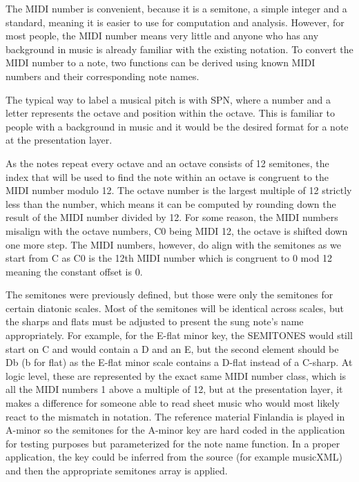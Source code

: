 The MIDI number is convenient, because it is a semitone, a simple integer and a standard, meaning it is easier to use for computation and analysis. However, for most people, the MIDI number means very little and anyone who has any background in music is already familiar with the existing notation. To convert the MIDI number to a note, two functions can be derived using known MIDI numbers and their corresponding note names. 

The typical way to label a musical pitch is with SPN, where a number and a letter represents the octave and position within the octave. This is familiar to people with a background in music and it would be the desired format for a note at the presentation layer.

As the notes repeat every octave and an octave consists of 12 semitones, the index that will be used to find the note within an octave is congruent to the MIDI number modulo 12. The octave number is the largest multiple of 12 strictly less than the number, which means it can be computed by rounding down the result of the MIDI number divided by 12. For some reason, the MIDI numbers misalign with the octave numbers, C0 being MIDI 12, the octave is shifted down one more step. The MIDI numbers, however, do align with the semitones as we start from C as C0 is the 12th MIDI number which is congruent to 0 mod 12 meaning the constant offset is 0.


The semitones were previously defined, but those were only the semitones for certain diatonic scales. Most of the semitones will be identical across scales, but the sharps and flats must be adjusted to present the sung note's name appropriately. For example, for the E-flat minor key, the SEMITONES would still start on C and would contain a D and an E, but the second element should be Db (b for flat) as the E-flat minor scale contains a D-flat instead of a C-sharp. At logic level, these are represented by the exact same MIDI number class, which is all the MIDI numbers 1 above a multiple of 12, but at the presentation layer, it makes a difference for someone able to read sheet music who would most likely react to the mismatch in notation. The reference material Finlandia is played in A-minor so the semitones for the A-minor key are hard coded in the application for testing purposes but parameterized for the note name function. In a proper application, the key could be inferred from the source (for example musicXML) and then the appropriate semitones array is applied.

